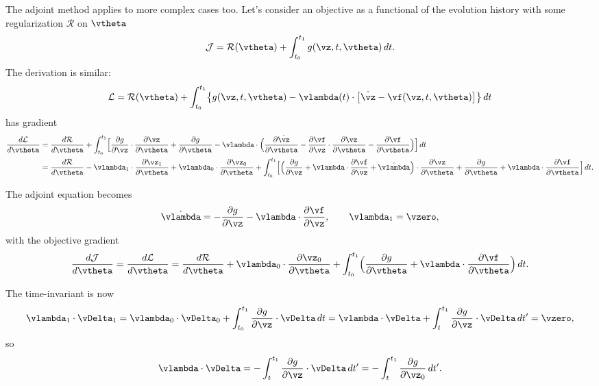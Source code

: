 \documentclass[modern, dvipsnames]{aastex631}
\renewcommand{\d}{d}
\newcommand{\p}{\partial}
\newcommand{\cJ}{\mathcal{J}}
\newcommand{\cR}{\mathcal{R}}
\newcommand{\cL}{\mathcal{L}}
\begin{document}
The adjoint method applies to more complex cases too.
Let's consider an objective as a functional of the evolution history
with some regularization $\cR$ on $\vtheta$
%
\begin{equation}
\cJ = \cR(\vtheta) + \int_{t_0}^{t_1} g(\vz, t, \vtheta) \, \d t.
\end{equation}
%
The derivation is similar:
%
\begin{equation}
\cL = \cR(\vtheta)
+ \int_{t_0}^{t_1} \bigl\{ g(\vz, t, \vtheta) -
  \vlambda(t) \cdot \bigl[ \dot\vz - \vf(\vz, t, \vtheta) \bigr]
  \bigr\} \, \d t
\end{equation}
%
has gradient
%
\begin{align}
\frac{\d\cL}{\d\vtheta}
&= \frac{\d\cR}{\d\vtheta}
+ \int_{t_0}^{t_1} \Bigl[
    \frac{\p g}{\p\vz} \cdot \frac{\p\vz}{\p\vtheta}
    + \frac{\p g}{\p\vtheta}
    - \vlambda \cdot \Bigl( \frac{\p\dot\vz}{\p\vtheta}
    - \frac{\p\vf}{\p\vz} \cdot \frac{\p\vz}{\p\vtheta}
    - \frac{\p\vf}{\p\vtheta} \Bigr) \Bigr] \, \d t \\
%
&= \frac{\d\cR}{\d\vtheta}
- \vlambda_1 \cdot \frac{\p\vz_1}{\p\vtheta}
+ \vlambda_0 \cdot \frac{\p\vz_0}{\p\vtheta}
+ \int_{t_0}^{t_1} \Bigl[
  \Bigl( \frac{\p g}{\p\vz} + \vlambda \cdot \frac{\p\vf}{\p\vz}
    + \dot\vlambda \Bigr) \cdot \frac{\p\vz}{\p\vtheta}
  + \frac{\p g}{\p\vtheta} + \vlambda \cdot \frac{\p\vf}{\p\vtheta}
\Bigr] \, \d t. \nonumber
\end{align}

The adjoint equation becomes
%
\begin{equation}
\dot\vlambda = - \frac{\p g}{\p\vz}
  - \vlambda \cdot \frac{\p\vf}{\p\vz},
\qquad
\vlambda_1 = \vzero,
\end{equation}
%
with the objective gradient
%
\begin{equation}
\frac{\d\cJ}{\d\vtheta}
= \frac{\d\cL}{\d\vtheta}
= \frac{\d\cR}{\d\vtheta} + \vlambda_0 \cdot \frac{\p\vz_0}{\p\vtheta}
+ \int_{t_0}^{t_1} \Bigl( \frac{\p g}{\p\vtheta}
  + \vlambda \cdot \frac{\p\vf}{\p\vtheta} \Bigr) \, \d t.
\end{equation}

The time-invariant is now
%
\begin{equation}
\vlambda_1 \cdot \vDelta_1
= \vlambda_0 \cdot \vDelta_0
  + \int_{t_0}^{t_1} \frac{\p g}{\p\vz} \cdot \vDelta \, \d t
= \vlambda \cdot \vDelta
  + \int_t^{t_1} \frac{\p g}{\p\vz} \cdot \vDelta \, \d t'
= \vzero,
\end{equation}
%
so
%
\begin{equation}
\vlambda \cdot \vDelta
= - \int_t^{t_1} \frac{\p g}{\p\vz} \cdot \vDelta \, \d t'
= - \int_t^{t_1} \frac{\p g}{\p\vz_0} \, \d t'.
\end{equation}
\end{document}

